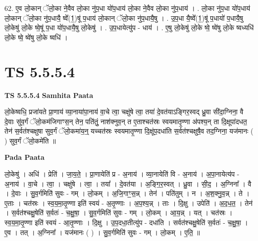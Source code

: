 \documentclass[17pt]{extarticle}
\begin{document}
62. ए॒व लो॒कान् ॅलो॒का ने॒वैव लो॒का नु॑प॒धा यो॑प॒धाय॑ लो॒का ने॒वैव लो॒का नु॑प॒धाय॑ । . लो॒का नु॑प॒धा यो॑प॒धाय॑ लो॒कान् ॅलो॒का नु॑प॒धायै॒ ष्वे᳚(1॒)षू॑ प॒धाय॑ लो॒कान् ॅलो॒का नु॑प॒धायै॒षु । . उ॒प॒धा यै॒ष्वे᳚(1॒)षू॑ प॒धायो॑ प॒धायै॒षु लो॒केषु॑ लो॒के ष्वे॒षू॑ प॒धा यो॑प॒धायै॒षु लो॒केषु॑ । . उ॒प॒धायेत्यु॑प - धाय॑ । . ए॒षु लो॒केषु॑ लो॒के ष्वे॒ ष्वे॑षु लो॒के ष्वध्यधि॑ लो॒के ष्वे॒ ष्वे॑षु लो॒के ष्वधि॑ । \newline
\pagebreak
{}

\section{ TS 5.5.5.4 }

\textbf{TS 5.5.5.4 } \newline
\textbf{Samhita Paata} \newline

लो॒केष्वधि॒ प्रजा॑यते प्रा॒णाय॑ व्या॒नाया॑पा॒नाय॑ वा॒चे त्वा॒ चक्षु॑षे त्वा॒ तया॑ दे॒वत॑याऽङ्गिर॒स्वद् ध्रु॒वा सी॑दा॒ग्निना॒ वै दे॒वाः सु॑व॒र्गं ॅलो॒कम॑जिगाꣳस॒न् तेन॒ पति॑तुं॒ नाश॑क्नुव॒न् त ए॒ताश्चत॑स्रः स्वयमातृ॒ण्णा अ॑पश्य॒न् ता दि॒क्षूपा॑दधत॒ तेन॑ स॒र्वत॑श्चक्षुषा सुव॒र्गं ॅलो॒कमा॑य॒न्॒ यच्चत॑स्रः स्वयमातृ॒ण्णा दि॒क्षू॑प॒दधा॑ति स॒र्वत॑श्चक्षुषै॒व तद॒ग्निना॒ यज॑मानः ( ) सुव॒र्गं ॅलो॒कमे॑ति ॥ \newline

\textbf{Pada Paata} \newline

लो॒केषु॑ । अधि॑ । प्रेति॑ । जा॒य॒ते॒ । प्रा॒णायेति॑ प्र - अ॒नाय॑ । व्या॒नायेति॑ वि - अ॒नाय॑ । अ॒पा॒नायेत्य॑प - अ॒नाय॑ । वा॒चे । त्वा॒ । चक्षु॑षे । त्वा॒ । तया᳚ । दे॒वत॑या । अ॒ङ्गि॒र॒स्वत् । ध्रु॒वा । सी॒द॒ । अ॒ग्निना᳚ । वै । दे॒वाः । सु॒व॒र्गमिति॑ सुवः - गम् । लो॒कम् । अ॒जि॒गाꣳ॒॒स॒न्न् । तेन॑ । पति॑तुम् । न । अ॒श॒क्नु॒व॒न्न् । ते । ए॒ताः । चत॑स्रः । स्व॒य॒मा॒तृ॒ण्णा इति॑ स्वयं - अ॒तृ॒ण्णाः । अ॒प॒श्य॒न्न् । ताः । दि॒क्षु । उपेति॑ । अ॒द॒ध॒त॒ । तेन॑ । स॒र्वत॑श्चक्षु॒षेति॑ स॒र्वतः॑ - च॒क्षु॒षा॒ । सु॒व॒र्गमिति॑ सुवः - गम् । लो॒कम् । आ॒य॒न्न् । यत् । चत॑स्रः । स्व॒य॒मा॒तृ॒ण्णा इति॑ स्वयं - आ॒तृ॒ण्णाः । दि॒क्षु । उ॒प॒दधा॒तीत्यु॑प - दधा॑ति । सर्वत॑श्चक्षु॒षेति॑ स॒र्वतः॑ - च॒क्षु॒षा॒ । ए॒व । तत् । अ॒ग्निना᳚ । यज॑मानः ( ) । सु॒व॒र्गमिति॑ सुवः - गम् । लो॒कम् । ए॒ति॒ ॥  \newline
\end{document}
